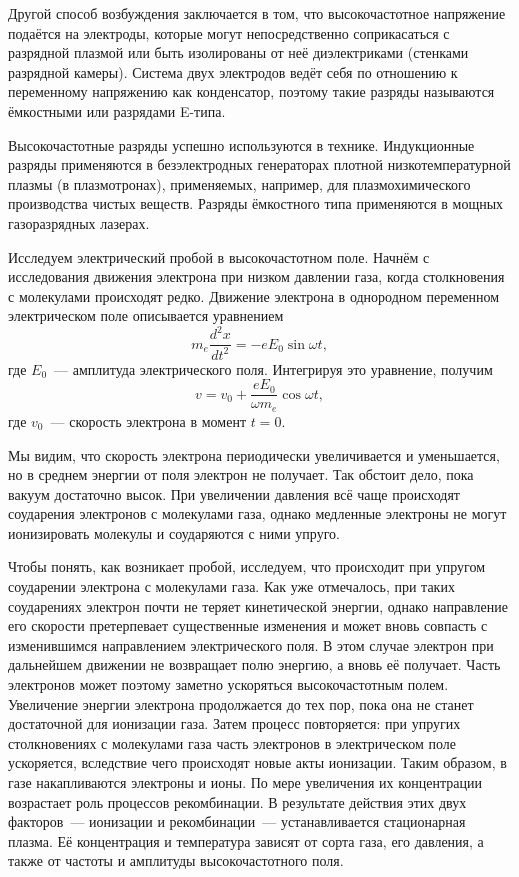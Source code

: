Другой способ возбуждения заключается в том, что высокочастотное напряжение подаётся на электроды, которые могут
непосредственно соприкасаться с разрядной плазмой или быть изолированы от неё диэлектриками (стенками разрядной камеры).
Система двух электродов ведёт себя по отношению к переменному напряжению как конденсатор, поэтому такие разряды
называются ёмкостными или разрядами E-типа.

Высокочастотные разряды успешно используются в технике. Индукционные разряды применяются в безэлектродных генераторах
плотной низкотемпературной плазмы (в плазмотронах), применяемых, например, для плазмохимического производства чистых
веществ. Разряды ёмкостного типа применяются в мощных газоразрядных лазерах.

Исследуем электрический пробой в высокочастотном поле. Начнём с исследования движения электрона при низком давлении
газа, когда столкновения с молекулами происходят редко. Движение электрона в однородном переменном электрическом поле
описывается уравнением
\begin{equation*}
	m_e\frac{d^2x}{dt^2}=-eE_0\sin\omega t,
\end{equation*}
где $E_0$~--- амплитуда электрического поля. Интегрируя это уравнение, получим
\begin{equation*}
	v=v_0+\frac{eE_0}{\omega m_e}\cos\omega t,
\end{equation*}
где $v_0$~--- скорость электрона в момент $t=0$.

Мы видим, что скорость электрона периодически увеличивается и уменьшается, но в среднем энергии от поля электрон не
получает. Так обстоит дело, пока вакуум достаточно высок. При увеличении давления всё чаще происходят соударения
электронов с молекулами газа, однако медленные электроны не могут ионизировать молекулы и соударяются с ними упруго.

Чтобы понять, как возникает пробой, исследуем, что происходит при упругом соударении электрона с молекулами газа. Как
уже отмечалось, при таких соударениях электрон почти не теряет кинетической энергии, однако направление его скорости
претерпевает существенные изменения и может вновь совпасть с изменившимся направлением электрического поля. В этом
случае электрон при дальнейшем движении не возвращает полю энергию, а вновь её получает. Часть электронов может поэтому
заметно ускоряться высокочастотным полем. Увеличение энергии электрона продолжается до тех пор, пока она не станет
достаточной для ионизации газа. Затем процесс повторяется: при упругих столкновениях с молекулами газа часть электронов
в электрическом поле ускоряется, вследствие чего происходят новые акты ионизации. Таким образом, в газе накапливаются
электроны и ионы. По мере увеличения их концентрации возрастает роль процессов рекомбинации. В результате действия этих
двух факторов~--- ионизации и рекомбинации~--- устанавливается стационарная плазма. Её концентрация и температура
зависят от сорта газа, его давления, а также от частоты и амплитуды высокочастотного поля.

